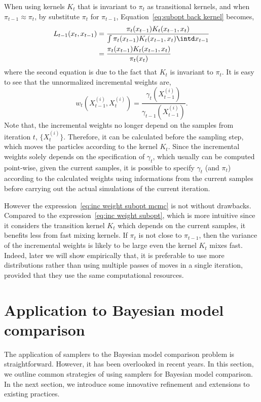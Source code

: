 When using \mcmc kernels $K_t$ that is invariant to $\pi_t$ as transitional
kernels, and when $\pi_{t-1}\approx\pi_t$, by substitute $\pi_t$ for
$\pi_{t-1}$, Equation~\eqref{eq:subopt back kernel} becomes,
\begin{align}
  L_{t-1}(x_t,x_{t-1})
  &= \frac{\pi_t(x_{t-1})K_t(x_{t-1},x_t)}
  {\int \pi_t(x_{t-1})K_t(x_{t-1},x_t)\intd x_{t-1}} \notag\\
  &= \frac{\pi_t(x_{t-1})K_t(x_{t-1},x_t)}{\pi_t(x_t)}
  \label{eq:subopt back kernel mcmc}
\end{align}
where the second equation is due to the fact that $K_t$ is invariant to
$\pi_t$. It is easy to see that the unnormalized incremental weights are,
\begin{equation}
  w_t(X_{t-1}^{(i)},X_t^{(i)}) =
  \frac{\gamma_t(X_{t-1}^{(i)})}{\gamma_{t-1}(X_{t-1}^{(i)})}.
  \label{eq:inc weight subopt mcmc}
\end{equation}
Note that, the incremental weights no longer depend on the samples from
iteration $t$, $\{X_t^{(i)}\}$. Therefore, it can be calculated before the
sampling step, which moves the particles according to the kernel $K_t$. Since
the incremental weights solely depends on the specification of $\gamma_t$,
which usually can be computed point-wise, given the current samples, it is
possible to specify $\gamma_t$ (and $\pi_t$) according to the calculated
weights using informations from the current samples before carrying out the
actual simulations of the current iteration.

However the expression~\eqref{eq:inc weight subopt mcmc} is not without
drawbacks. Compared to the expression~\eqref{eq:inc weight subopt}, which is
more intuitive since it considers the transition kernel $K_t$ which depends on
the current samples, it benefits less from fast mixing kernels. If $\pi_t$ is
not close to $\pi_{t-1}$, then the variance of the incremental weights is
likely to be large even the kernel $K_t$ mixes fast. Indeed, later we will
show empirically that, it is preferable to use more distributions rather than
using multiple passes of \mcmc moves in a single iteration, provided that they
use the same computational resources.

\section{Application to Bayesian model comparison}
\label{sec:Application to Bayesian model comparison}

The application of \smc samplers to the Bayesian model comparison problem is
straightforward. However, it has been overlooked in recent years. In this
section, we outline common strategies of using \smc samplers for Bayesian
model comparison. In the next section, we introduce some innovative refinement
and extensions to existing practices.

